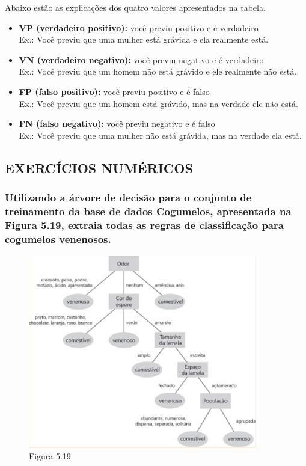 \documentclass{article}
\begin{document}
Abaixo estão as explicações dos quatro valores apresentados na tabela.

\begin{itemize}
  \item \textbf{VP (verdadeiro positivo):} você previu positivo e é verdadeiro \\ Ex.: Você previu que uma mulher está grávida e ela realmente está.
  \item \textbf{VN (verdadeiro negativo):} você previu negativo e é verdadeiro \\ Ex.: Você previu que um homem não está grávido e ele realmente não está.
  \item \textbf{FP (falso positivo):} você previu positivo e é falso \\ Ex.: Você previu que um homem está grávido, mas na verdade ele não está.
  \item \textbf{FN (falso negativo):} você previu negativo e é falso \\ Ex.: Você previu que uma mulher não está grávida, mas na verdade ela está.
\end{itemize}
\newpage

\subsection{EXERCÍCIOS NUMÉRICOS}

\subsubsection{Utilizando a árvore de decisão para o conjunto de treinamento da base de dados Cogumelos, apresentada na Figura 5.19, extraia todas as regras de classificação para cogumelos venenosos.}
\begin{figure}[H]
  \centering 
  \includegraphics[width=10cm]{Figura-5-19.png} 
  \caption*{Figura 5.19}
\end{figure}
\end{document}
